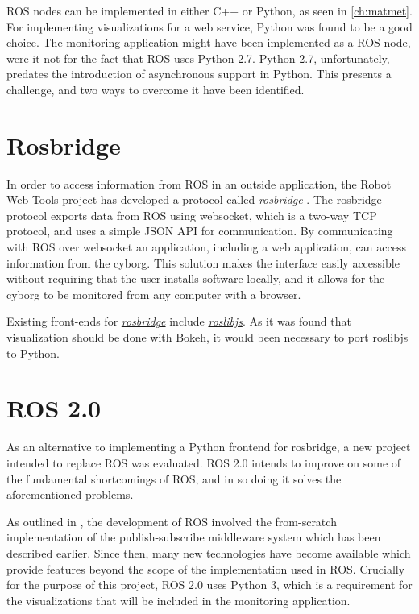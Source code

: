 \documentclass[\rootfolder/main.tex]{subfiles}
\begin{document}
ROS nodes can be implemented in either C++ or Python, as seen in \cref{ch:matmet}.
For implementing visualizations for a web service, Python was found to be a good choice.
The monitoring application might have been implemented as a ROS node, were it not for the fact that ROS uses Python 2.7.
Python 2.7, unfortunately, predates the introduction of asynchronous support in Python.
This presents a challenge, and two ways to overcome it have been identified.

\section{Rosbridge}

In order to access information from ROS in an outside application, the Robot Web Tools project has developed a protocol called \emph{rosbridge} \cite{Toris}. 
The rosbridge protocol exports data from ROS using websocket, which is a two-way TCP protocol, and uses a simple JSON API for communication.
By communicating with ROS over websocket an application, including a web application, can access information from the cyborg.
This solution makes the interface easily accessible without requiring that the user installs software locally, and it allows for the cyborg to be monitored from any computer with a browser.

Existing front-ends for \href{http://wiki.ros.org/rosbridge_suite}{\emph{rosbridge}} include \href{http://wiki.ros.org/roslibjs}{\emph{roslibjs}}.
As it was found that visualization should be done with Bokeh, it would been necessary to port roslibjs to Python.

\section{ROS 2.0}

As an alternative to implementing a Python frontend for rosbridge, a new project intended to replace ROS was evaluated.
ROS 2.0 intends to improve on some of the fundamental shortcomings of ROS, and in so doing it solves the aforementioned problems.

As outlined in \cite{Gerkey2017}, the development of ROS involved the from-scratch implementation of the publish-subscribe middleware system which has been described earlier.
Since then, many new technologies have become available which provide features beyond the scope of the implementation used in ROS.
Crucially for the purpose of this project, ROS 2.0 uses Python 3, which is a requirement for the visualizations that will be included in the monitoring application.
\end{document}

